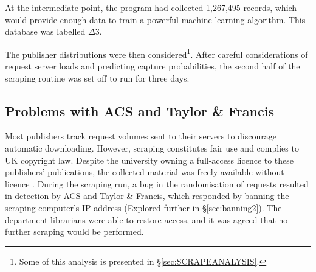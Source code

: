 At the intermediate point, the program had collected 1,267,495 records, which would provide enough data to train a powerful machine learning algorithm. This database was labelled $\Delta3$.

The publisher distributions were then considered\footnote{Some of this analysis is presented in \S\ref{sec:SCRAPEANALYSIS}.}. After careful considerations of request server loads and predicting capture probabilities, the second half of the scraping routine was set off to run for three days.
\label{sec:CROSSREFSCRAPE}
\subsection{Problems with ACS and Taylor \& Francis}
\label{sec:banning1}
Most publishers track request volumes sent to their servers to discourage automatic downloading. However, scraping constitutes fair use and complies to UK copyright law. Despite the university owning a full-access licence to these publishers' publications, the collected material was freely available without licence\cite{thelaw} \cite{contentminelegal}. During the scraping run, a bug in the randomisation of requests resulted in detection by ACS and Taylor \& Francis, which responded by banning the scraping computer's IP address (Explored further in \S\ref{sec:banning2}). The department librarians were able to restore access, and it was agreed that no further scraping would be performed.
